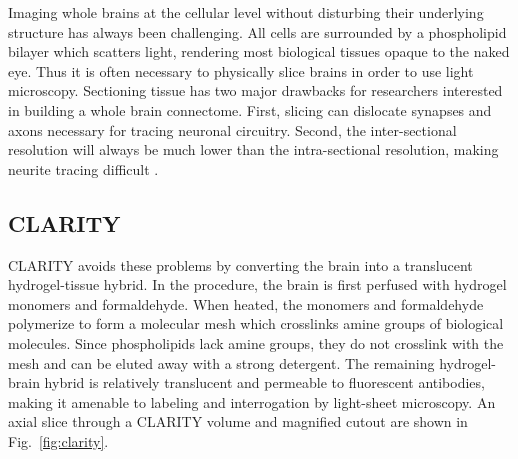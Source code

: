 \documentclass[]{spie}  %
\begin{document}
Imaging whole brains at the cellular level without disturbing their underlying structure has always been challenging.
All cells are surrounded by a phospholipid bilayer which scatters light, rendering most biological tissues opaque to the naked eye.
Thus it is often necessary to physically slice brains in order to use light microscopy.
Sectioning tissue has two major drawbacks for researchers interested in building a whole brain connectome.
First, slicing can dislocate synapses and axons necessary for tracing neuronal circuitry.
Second, the inter-sectional resolution will always be much lower than the intra-sectional resolution, making neurite tracing difficult \cite{Kim}.

\subsection{CLARITY}
CLARITY avoids these problems by converting the brain into a translucent hydrogel-tissue hybrid.
In the procedure, the brain is first perfused with hydrogel monomers and formaldehyde.
When heated, the monomers and formaldehyde polymerize to form a molecular mesh which crosslinks amine groups of biological molecules.
Since phospholipids lack amine groups, they do not crosslink with the mesh and can be eluted away with a strong detergent.
The remaining hydrogel-brain hybrid is relatively translucent and permeable to fluorescent antibodies, making it amenable to labeling and interrogation by light-sheet microscopy. \cite{Chung, Tomer}
An axial slice through a CLARITY volume and magnified cutout are shown in Fig.~\ref{fig:clarity}.
\end{document}

